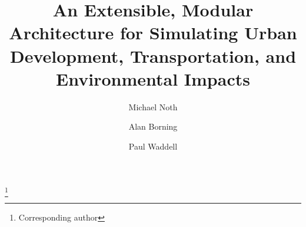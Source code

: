 
\title{An Extensible, Modular Architecture for Simulating Urban
Development, Transportation, and Environmental Impacts}
\author{Michael Noth}
\renewcommand{\thefootnote}{\fnsymbol{footnote}}
\setcounter{footnote}{0} \hspace{-7.5mm} \footnote{Corresponding
author}
\author{Alan Borning}
\address{Dept.\ of Computer Science \& Engineering,
University of Washington, \\
Box 352350,
Seattle, Washington 98195,
\{noth,borning\}@cs.washington.edu}
\author{Paul Waddell}
\address{Evans School of Public Affairs,
University of Washington, \\
Box 353055, Seattle, Washington 98195,
pwaddell@u.washington.edu}

\renewcommand{\thefootnote}{\arabic{footnote}}
\setcounter{footnote}{0}




